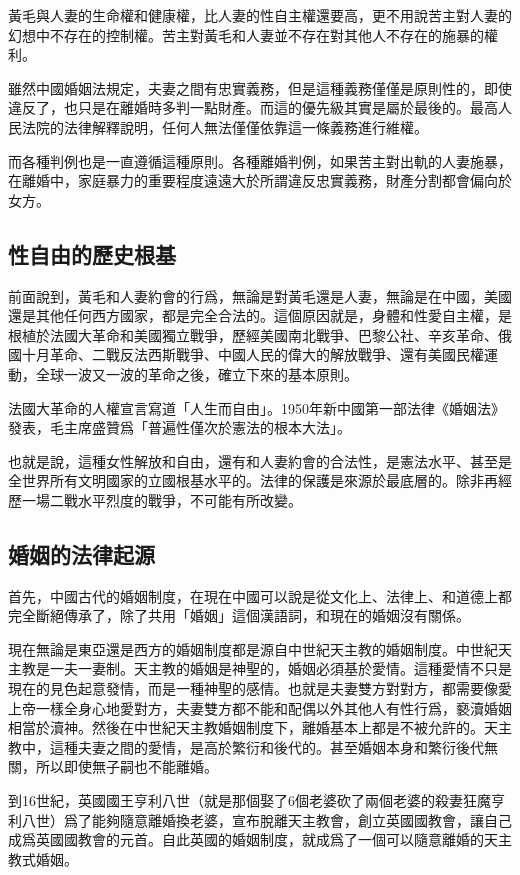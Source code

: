 黃毛與人妻的生命權和健康權，比人妻的性自主權還要高，更不用說苦主對人妻的幻想中不存在的控制權。苦主對黃毛和人妻並不存在對其他人不存在的施暴的權利。

雖然中國婚姻法規定，夫妻之間有忠實義務，但是這種義務僅僅是原則性的，即使違反了，也只是在離婚時多判一點財產。而這的優先級其實是屬於最後的。最高人民法院的法律解釋說明，任何人無法僅僅依靠這一條義務進行維權。

而各種判例也是一直遵循這種原則。各種離婚判例，如果苦主對出軌的人妻施暴，在離婚中，家庭暴力的重要程度遠遠大於所謂違反忠實義務，財產分割都會偏向於女方。

\subsection{性自由的歷史根基}

前面說到，黃毛和人妻約會的行爲，無論是對黃毛還是人妻，無論是在中國，美國還是其他任何西方國家，都是完全合法的。這個原因就是，身體和性愛自主權，是根植於法國大革命和美國獨立戰爭，歷經美國南北戰爭、巴黎公社、辛亥革命、俄國十月革命、二戰反法西斯戰爭、中國人民的偉大的解放戰爭、還有美國民權運動，全球一波又一波的革命之後，確立下來的基本原則。

法國大革命的人權宣言寫道「人生而自由」。1950年新中國第一部法律《婚姻法》發表，毛主席盛贊爲「普遍性僅次於憲法的根本大法」。

也就是說，這種女性解放和自由，還有和人妻約會的合法性，是憲法水平、甚至是全世界所有文明國家的立國根基水平的。法律的保護是來源於最底層的。除非再經歷一場二戰水平烈度的戰爭，不可能有所改變。

\subsection{婚姻的法律起源}

首先，中國古代的婚姻制度，在現在中國可以說是從文化上、法律上、和道德上都完全斷絕傳承了，除了共用「婚姻」這個漢語詞，和現在的婚姻沒有關係。

現在無論是東亞還是西方的婚姻制度都是源自中世紀天主教的婚姻制度。中世紀天主教是一夫一妻制。天主教的婚姻是神聖的，婚姻必須基於愛情。這種愛情不只是現在的見色起意發情，而是一種神聖的感情。也就是夫妻雙方對對方，都需要像愛上帝一樣全身心地愛對方，夫妻雙方都不能和配偶以外其他人有性行爲，褻瀆婚姻相當於瀆神。然後在中世紀天主教婚姻制度下，離婚基本上都是不被允許的。天主教中，這種夫妻之間的愛情，是高於繁衍和後代的。甚至婚姻本身和繁衍後代無關，所以即使無子嗣也不能離婚。

到16世紀，英國國王亨利八世（就是那個娶了6個老婆砍了兩個老婆的殺妻狂魔亨利八世）爲了能夠隨意離婚換老婆，宣布脫離天主教會，創立英國國教會，讓自己成爲英國國教會的元首。自此英國的婚姻制度，就成爲了一個可以隨意離婚的天主教式婚姻。

